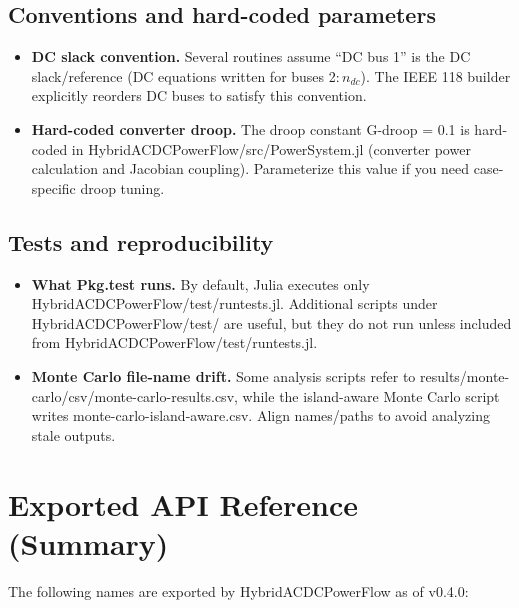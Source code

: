 \documentclass[11pt]{article}
\def\code#1{#1}%
\def\file#1{#1}%
\def\_{-}%
\newcommand{\code}[1]{\nolinkurl{#1}}
\newcommand{\file}[1]{\path{#1}}
\begin{document}
\subsection{Conventions and hard-coded parameters}
\begin{itemize}[leftmargin=*]
  \item \textbf{DC slack convention.} Several routines assume ``DC bus 1'' is the DC slack/reference (DC equations written for buses 2:\,$n_{dc}$). The IEEE 118 builder explicitly reorders DC buses to satisfy this convention.
  \item \textbf{Hard-coded converter droop.} The droop constant \code{G\_droop = 0.1} is hard-coded in \file{HybridACDCPowerFlow/src/PowerSystem.jl} (converter power calculation and Jacobian coupling). Parameterize this value if you need case-specific droop tuning.
\end{itemize}

\subsection{Tests and reproducibility}
\begin{itemize}[leftmargin=*]
  \item \textbf{What \code{Pkg.test} runs.} By default, Julia executes only \file{HybridACDCPowerFlow/test/runtests.jl}. Additional scripts under \file{HybridACDCPowerFlow/test/} are useful, but they do not run unless included from \file{HybridACDCPowerFlow/test/runtests.jl}.
  \item \textbf{Monte Carlo file-name drift.} Some analysis scripts refer to \file{results/monte\_carlo/csv/monte\_carlo\_results.csv}, while the island-aware Monte Carlo script writes \file{monte\_carlo\_island\_aware.csv}. Align names/paths to avoid analyzing stale outputs.
\end{itemize}

\section{Exported API Reference (Summary)}\label{sec:api-summary}
The following names are exported by \code{HybridACDCPowerFlow} as of v0.4.0:
\end{document}
